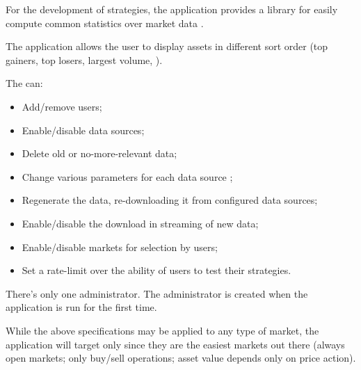 For the development of strategies, the application provides a library for easily
compute common statistics over market data .

The application allows the user to display assets in different sort order (top
gainers, top losers, largest volume, \etc).

The  can:
\begin{itemize}
	\item Add/remove users;
	\item Enable/disable data sources;
	\item Delete old or no-more-relevant data;
	\item Change various parameters for each data source ;
	\item Regenerate the data, re-downloading it from configured data
		sources;
	\item Enable/disable the download in streaming of new data;
	\item Enable/disable markets for selection by users;
	\item Set a rate-limit over the ability of users to test their
		strategies.
\end{itemize}

There's only one administrator. The administrator is created when the
application is run for the first time.

While the above specifications may be applied to any type of market, the
application will target only  since they are
the easiest markets out there (always open markets; only buy/sell operations;
asset value depends only on price action).
